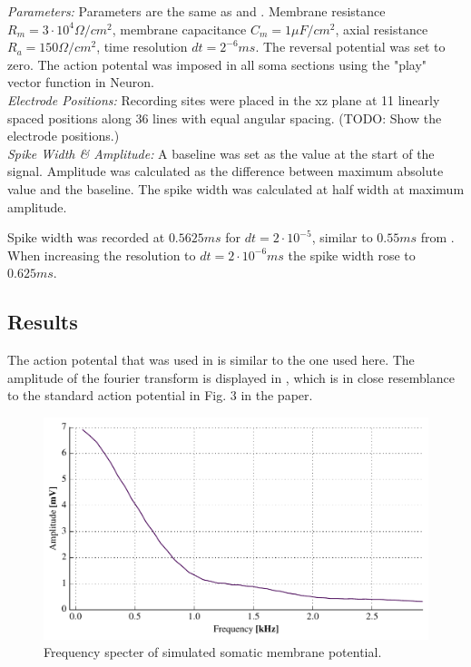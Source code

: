 \documentclass[altfont, fleqn]{uiophd}
\renewcommand{\cref}[1]{{\color{viridis_03}\mycref{#1}} }
\begin{document}
\noindent\emph{Parameters:}
Parameters are the same as \textcite{pettersen_amplitude_2008} and 
\textcite{dayan_theoretical_2001} . Membrane resistance 
$R_m = 3\cdot10^4\Omega /cm^2$, membrane capacitance $C_m=1\mu F / cm^2$, 
axial resistance $R_a = 150\Omega/cm^2$, time resolution $dt=2^{-6}ms$. 
The reversal potential was set to zero. The action potental was imposed in all
soma sections using the "play" vector function in Neuron.
\\

\noindent\emph{Electrode Positions:}
Recording sites were placed in the xz plane at 11 linearly spaced 
positions along 36 lines with equal 
angular spacing. (TODO: Show the electrode positions.) 
\\


\noindent\emph{Spike Width \& Amplitude:}
A baseline was set as the value at the start of the signal. 
Amplitude was calculated as the difference between maximum absolute value and the
baseline.
The spike width was calculated at half width at maximum amplitude. 

Spike width was recorded at $0.5625 ms$ for $dt=2\cdot10^{-5}$, similar to 
$0.55ms$ from \textcite{pettersen_amplitude_2008}. When increasing the
resolution to $dt=2\cdot10^{-6}ms$ the spike width rose to $0.625ms$. 


\subsection{Results}
The action potental that was used in \textcite{pettersen_amplitude_2008} 
is similar to the one used here.  The amplitude of the fourier transform is displayed in
\cref{fig:3_1_fourier}, which is in close resemblance to the standard action potential
in Fig. $3$ in the paper. 

\begin{figure}[thp]
\centering
\includegraphics[width=\textwidth]{images/3_methods/3_1_reproduction/soma_mem_fourier.pdf}
\caption{Frequency specter of simulated somatic membrane potential.}
\label{fig:3_1_fourier}
\end{figure}
\end{document}
